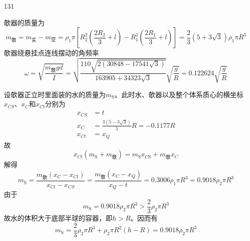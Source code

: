 \begin{solution}{131}
\begin{subsolution}
        欹器的质量为
        \begin{equation}
            m _ {\text {欹}} = m _ {\text {实}} - m _ {\text {空}} = \rho_ {1} \pi \left[ R _ {2} ^ {2} \left(\frac {2 R _ {2}}{3} + l\right) - R _ {1} ^ {2} \left(\frac {2 R _ {1}}{3} + l\right) \right] = \frac {2}{3} (5 + 3 \sqrt {3}) \rho_ {1} \pi R ^ {3}
            \label{eq:16.s131}
        \end{equation}
        欹器绕悬挂点连线摆动的角频率
        \begin{equation}
            \omega = \sqrt {\frac {m _ {\text {欹}} g d}{I}} = \sqrt {\frac {110 \sqrt {2 (30848 - 17541 \sqrt {3})}}{163905 + 34323 \sqrt {3}}} \sqrt {\frac {g}{R}} = 0.122624 \sqrt {\frac {g}{R}}
            \label{eq:17.s131}
        \end{equation}
    \end{subsolution}
    \begin{subsolution}
        设欹器正立时里面装的水的质量为$m _ { \mathrm { S } }$。此时水、欹器以及整个体系质心的横坐标$x _ { C S }$、$x _ { C }$和$x _ { C t }$分别为
        \begin{align}
            x _ {C S} &= t \label{eq:18.s131} \\
            x _ {C} &= \frac {3 (5 - 3 \sqrt {3})}{5} R = - 0.1177 R \label{eq:19.s131} \\
            x _ {C t} &= x _ {Q} \label{eq:20.s131}
        \end{align}
        故
        \begin{equation}
            x _ {C t} (m _ {\mathrm{S}} + m _ {\text {欹}}) = m _ {\mathrm{S}} x _ {C \mathrm{S}} + m _ {\text {欹}} x _ {C}
            \label{eq:21.s131}
        \end{equation}
        解得
        \begin{equation}
            m _ {\mathrm{S}} = \frac {m _ {\text {欹}} (x _ {C} - x _ {C t})}{x _ {C t} - x _ {C S}} = \frac {m _ {\text {欹}} (x _ {C} - x _ {Q})}{x _ {Q} - t} = 0.3006 \rho_ {1} \pi R ^ {3} = 0.9018 \rho_ {2} \pi R ^ {3}
            \label{eq:22.s131}
        \end{equation}
        由于
        \begin{equation}
            m _ {\mathrm{S}} = 0.9018 \rho_ {2} \pi R ^ {3} > \frac {2}{3} \rho_ {2} \pi R ^ {3}
            \label{eq:23.s131}
        \end{equation}
        故水的体积大于底部半球的容器，即$h > R$。因而有
        \begin{equation}
            m _ {\mathrm{S}} = \frac {2}{3} \rho_ {2} \pi R ^ {3} + \rho_ {2} \pi R ^ {2} (h - R) = 0.9018 \rho_ {2} \pi R ^ {3}

\end{equation}
\end{subsolution}
\end{solution}
